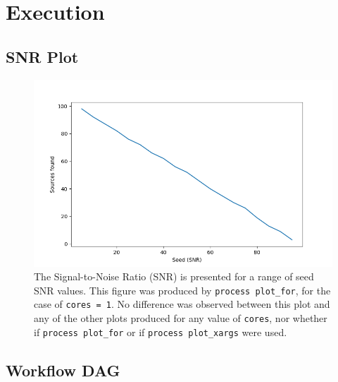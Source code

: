 \documentclass{article}
\begin{document}
\section{Execution}
\label{sec:execution}

\subsection{SNR Plot}
\label{sec:snr-plot}

\begin{figure}[h]
  \centering
  \includegraphics[scale = 0.75]{../nextflow/output/plot_for_1.png}
  \caption[SNR Plot]{
    The Signal-to-Noise Ratio (SNR) is presented for a range of seed SNR values.
    This figure was produced by
    \lstinline[morekeywords={process}]{process plot_for}, for the case of
    \lstinline{cores = 1}.
    No difference was observed between this plot and any of the other plots
    produced for any value of \lstinline{cores}, nor whether if
    \lstinline[morekeywords={process}]{process plot_for} or if
    \lstinline[morekeywords={process}]{process plot_xargs} were used.
  }
  \label{fig:snr-plot}
\end{figure}


\subsection{Workflow DAG}
\label{sec:workflow-dag}
\end{document}
